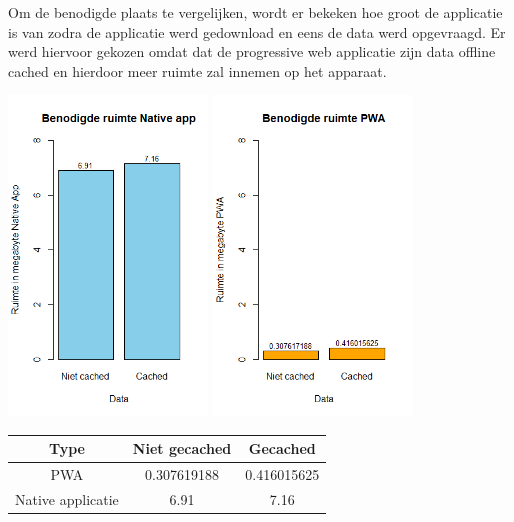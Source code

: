 \documentclass[a0,portrait]{a0poster}
\begin{document}
\begin{multicols}{2}
Om de benodigde plaats te vergelijken, wordt er bekeken hoe groot de applicatie is van zodra de applicatie werd gedownload en eens de data werd opgevraagd. Er werd hiervoor gekozen omdat dat de progressive web applicatie zijn data offline cached en hierdoor meer ruimte zal innemen op het apparaat. 
\begin{center}
	\includegraphics[width=200px]{Rplot_BenodigdeRuimte_NativeApp}
	\includegraphics[width=200px]{Rplot_BenodigdeRuimte_PWA}
\end{center}

\begin{center}
	\centering
\begin{tabular}{|c|c|c|}
	\hline
	Type              & Niet gecached    & Gecached    \\
	\hline
	PWA               & 0.307619188      & 0.416015625 \\
	\hline
	Native applicatie & 6.91             & 7.16        \\
	\hline
\end{tabular}
\end{center}


\end{multicols}
\end{document}

